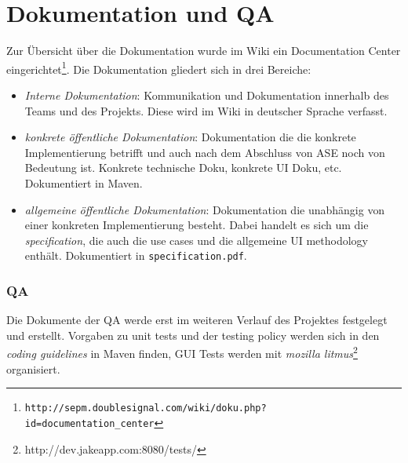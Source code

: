\section{Dokumentation und QA}
Zur Übersicht über die Dokumentation wurde im Wiki ein Documentation Center 
eingerichtet\footnote{\texttt{http://sepm.doublesignal.com/wiki/doku.php?id=documentation\_center}}. 
Die Dokumentation gliedert sich in drei Bereiche:

\begin{itemize}
\item \emph{Interne Dokumentation}: Kommunikation und Dokumentation innerhalb 
des Teams und des Projekts. Diese wird im Wiki in deutscher Sprache verfasst.
\item \emph{konkrete öffentliche Dokumentation}: Dokumentation die die konkrete 
Implementierung betrifft und auch nach dem Abschluss von ASE noch von Bedeutung 
ist. Konkrete technische Doku, konkrete UI Doku, etc. Dokumentiert in Maven.
\item \emph{allgemeine öffentliche Dokumentation}: Dokumentation die unabhängig 
von einer konkreten Implementierung besteht. Dabei handelt es sich um die \emph
{specification}, die auch die use cases und die allgemeine UI methodology 
enthält. Dokumentiert in \texttt{specification.pdf}. 
\end{itemize}

\subsubsection{QA}
Die Dokumente der QA werde erst im weiteren Verlauf des Projektes festgelegt 
und erstellt. Vorgaben zu unit tests und der testing policy werden sich in den 
\emph{coding guidelines} in Maven finden, GUI Tests werden mit \emph{mozilla 
litmus}\footnote{http://dev.jakeapp.com:8080/tests/} organisiert. 

